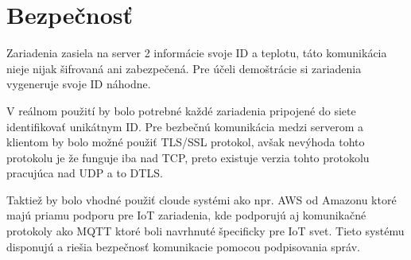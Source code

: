 \documentclass{article}
\begin{document}
\section{Bezpečnosť}
Zariadenia zasiela na server 2 informácie svoje ID a teplotu, táto komunikácia nieje nijak šifrovaná ani zabezpečená.
Pre účeli demoštrácie si zariadenia vygeneruje svoje ID náhodne.

V reálnom použití by bolo potrebné každé zariadenia pripojené do siete identifikovať unikátnym ID.
Pre bezbečnú komunikácia medzi serverom a klientom by bolo možné použiť TLS/SSL protokol, avšak nevýhoda tohto protokolu
je že funguje iba nad TCP, preto existuje verzia tohto protokolu pracujúca nad UDP a to DTLS\cite{odkaz:iotsecurity}.

Taktiež by bolo vhodné použiť cloude systémi ako npr. AWS od Amazonu ktoré majú priamu podporu
pre IoT zariadenia, kde podporujú aj komunikačné protokoly ako MQTT ktoré boli navrhnuté špecificky pre IoT svet.
Tieto systému disponujú a riešia bezpečnosť komunikacie pomocou podpisovania správ.

\renewcommand\refname{Odkazy}

\end{document}
